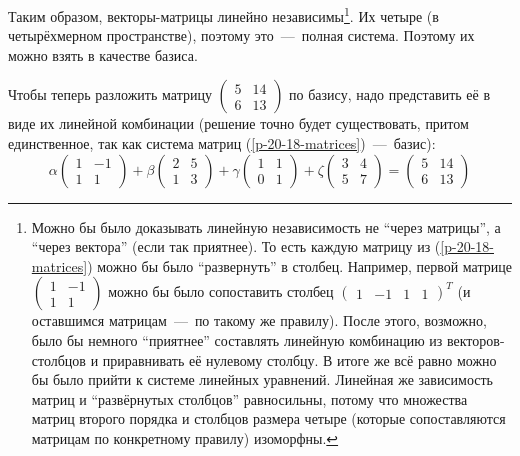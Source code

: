 \documentclass[a4paper,12pt]{article}
\begin{document}
  Таким образом, векторы-матрицы линейно независимы\footnote{
    Можно бы было доказывать линейную независимость не ``через матрицы'', а ``через вектора'' (если так приятнее).
    То есть каждую матрицу из (\ref{p-20-18-matrices}) можно бы было ``развернуть'' в столбец.
    Например, первой матрице $\left(\begin{smallmatrix} 1 & -1 \\ 1 & 1\end{smallmatrix}\right)$ можно бы было сопоставить столбец $\left(\begin{smallmatrix} 1 & -1 & 1 & 1\end{smallmatrix}\right)^T$ (и оставшимся матрицам~---~по такому же правилу).
    После этого, возможно, было бы немного ``приятнее'' составлять линейную комбинацию из векторов-столбцов и приравнивать её нулевому столбцу.
    В итоге же всё равно можно бы было прийти к системе линейных уравнений.
    Линейная же зависимость матриц и ``развёрнутых столбцов'' равносильны, потому что множества матриц второго порядка и столбцов размера четыре (которые сопоставляются матрицам по конкретному правилу) изоморфны.
  }.
  Их четыре (в четырёхмерном пространстве), поэтому это~---~полная система.
  Поэтому их можно взять в качестве базиса.
  
  \bigskip
  
  Чтобы теперь разложить матрицу $\left(\begin{smallmatrix} 5 & 14\\ 6 & 13 \end{smallmatrix}\right)$ по базису, надо представить её в виде их линейной комбинации (решение точно будет существовать, притом единственное, так как система матриц (\ref{p-20-18-matrices})~---~базис):
  \[
    \alpha \begin{pmatrix}
      1 & -1\\
      1 & 1
    \end{pmatrix} + \beta \begin{pmatrix}
      2 & 5\\
      1 & 3
    \end{pmatrix} + \gamma \begin{pmatrix}
      1 & 1\\
      0 & 1
    \end{pmatrix} + \zeta \begin{pmatrix}
      3 & 4\\
      5 & 7
    \end{pmatrix} = \begin{pmatrix}
      5 & 14\\
      6 & 13
    \end{pmatrix}
  \]
  
\end{document}
